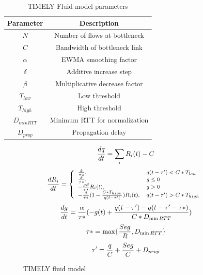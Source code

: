 \begin{table}[t]
\center
{
\footnotesize
{
\begin{tabular}{|c|c|} \hline
Parameter & Description \\ \hline
$N$ & Number of flows at bottleneck\\ \hline
$C$ & Bandwidth of bottleneck link\\ \hline
$\alpha$ & EWMA smoothing factor\\ \hline
$\delta$ & Additive increase step\\ \hline
$\beta$ & Multiplicative decrease factor\\ \hline
$T_{low}$ & Low threshold\\ \hline
$T_{high}$ & High threshold\\ \hline
$D_{minRTT}$ & Minimum RTT for normalization \\ \hline
$D_{prop}$ & Propagation delay \\ \hline
\end{tabular}
}
}
\caption{TIMELY Fluid model parameters}
\label{tab:timely_param}
\end{table}

\begin{figure}[h]
\fbox
{
\begin{minipage}{\columnwidth}
\begin{equation}
\small
\frac{{dq}}{{dt}} = \sum_{i} R_i(t) - C\\
\label{eq:timely_q}
\end{equation}
\begin{equation}
\small
\frac{{dR_i}}{{dt}} = \left\{ \begin{array}{ll}
\frac{\delta }{{\tau *}}, & q(t - \tau ') < C*{T_{low}}\\
\frac{\delta }{{\tau *}}, & g \le 0\\
 - \frac{{g\beta }}{{\tau *}}R_i(t), & g > 0\\
 - \frac{\beta }{{\tau *}}(1 - \frac{{C*{T_{high}}}}{{q(t - \tau ')}})R_i(t), & q(t - \tau ') > C*{T_{high}}
\end{array} \right.\\
\label{eq:timely_r}
\end{equation}
\begin{equation}
\small
\frac{{dg}}{{dt}} = \frac{\alpha }{{\tau *}}( - g(t) + \frac{{q(t - \tau ') - q(t - \tau ' - \tau *)}}{{C*{D_{\min RTT}}}})\\
\label{eq:timely_g}
\end{equation}
\begin{equation}
\small
\tau * = \max \{ \frac{{Seg}}{R},{D_{\min RTT}}\} \\
\label{eq:timely_taus}
\end{equation}
\begin{equation}
\small
\tau ' = \frac{q}{C} + \frac{{Seg}}{C} + {D_{prop}}
\label{eq:timely_taup}
\end{equation}
\end{minipage}
}
\caption{TIMELY fluid model}
\label{fig:timely_model}
\end{figure}

